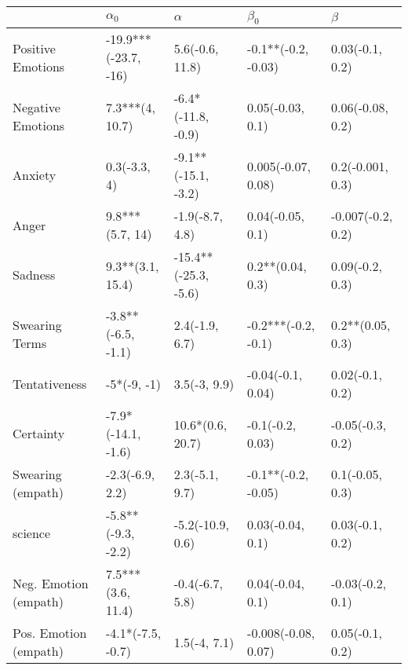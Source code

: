 \begin{tabular}{lllll}
\toprule
{} &            $\alpha_0$ &              $\alpha$ &            $\beta_0$ &            $\beta$ \\
\midrule
Positive Emotions     &  -19.9***(-23.7, -16) &       5.6(-0.6, 11.8) &  -0.1**(-0.2, -0.03) &    0.03(-0.1, 0.2) \\
Negative Emotions     &       7.3***(4, 10.7) &    -6.4*(-11.8, -0.9) &     0.05(-0.03, 0.1) &   0.06(-0.08, 0.2) \\
Anxiety               &          0.3(-3.3, 4) &   -9.1**(-15.1, -3.2) &   0.005(-0.07, 0.08) &   0.2(-0.001, 0.3) \\
Anger                 &       9.8***(5.7, 14) &       -1.9(-8.7, 4.8) &     0.04(-0.05, 0.1) &  -0.007(-0.2, 0.2) \\
Sadness               &      9.3**(3.1, 15.4) &  -15.4**(-25.3, -5.6) &     0.2**(0.04, 0.3) &    0.09(-0.2, 0.3) \\
Swearing Terms        &    -3.8**(-6.5, -1.1) &        2.4(-1.9, 6.7) &  -0.2***(-0.2, -0.1) &   0.2**(0.05, 0.3) \\
Tentativeness         &           -5*(-9, -1) &          3.5(-3, 9.9) &    -0.04(-0.1, 0.04) &    0.02(-0.1, 0.2) \\
Certainty             &    -7.9*(-14.1, -1.6) &      10.6*(0.6, 20.7) &     -0.1(-0.2, 0.03) &   -0.05(-0.3, 0.2) \\
Swearing (empath)     &       -2.3(-6.9, 2.2) &        2.3(-5.1, 9.7) &  -0.1**(-0.2, -0.05) &    0.1(-0.05, 0.3) \\
science               &    -5.8**(-9.3, -2.2) &      -5.2(-10.9, 0.6) &     0.03(-0.04, 0.1) &    0.03(-0.1, 0.2) \\
Neg. Emotion (empath) &     7.5***(3.6, 11.4) &       -0.4(-6.7, 5.8) &     0.04(-0.04, 0.1) &   -0.03(-0.2, 0.1) \\
Pos. Emotion (empath) &     -4.1*(-7.5, -0.7) &          1.5(-4, 7.1) &  -0.008(-0.08, 0.07) &    0.05(-0.1, 0.2) \\
\bottomrule
\end{tabular}
